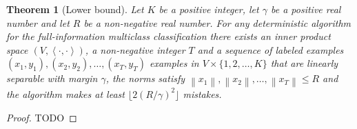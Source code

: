 \documentclass[12pt]{article}
\newtheorem{theorem}[definition]{Theorem}
\newcommand{\ip}[2]{\left\langle #1, #2 \right\rangle} %
\newcommand{\norm}[1]{\left\| #1 \right\|}  %
\begin{document}
\begin{theorem}[Lower bound]
Let $K$ be a positive integer, let $\gamma$ be a positive real number and let
$R$ be a non-negative real number. For any deterministic algorithm for the
full-information multiclass classification there exists an inner product space
$(V, \ip{\cdot}{\cdot})$, a non-negative integer $T$ and a sequence of labeled
examples $(x_1, y_1), (x_2, y_2), \dots, (x_T, y_T)$ examples in $V \times
\{1,2,\dots,K\}$ that are linearly separable with margin $\gamma$, the norms
satisfy $\norm{x_1}, \norm{x_2}, \dots, \norm{x_T} \le R$ and the algorithm
makes at least $\lfloor 2(R/\gamma)^2 \rfloor$ mistakes.
\end{theorem}

\begin{proof}
TODO
\end{proof}
\end{document}
